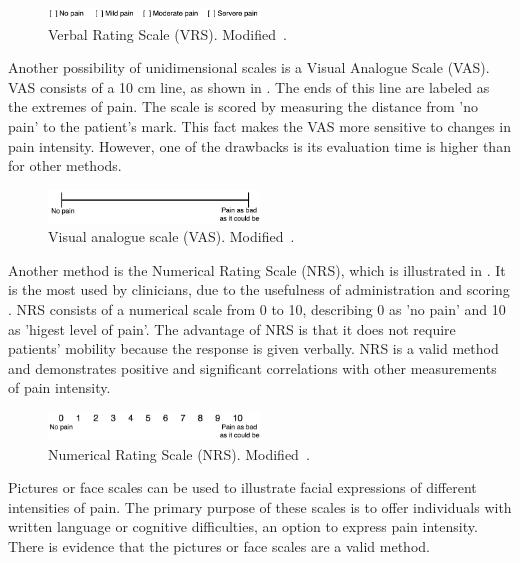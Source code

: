 \begin{figure}[H]
	\includegraphics[width=0.5\textwidth]{figures/VRS.png} 
	\caption{Verbal Rating Scale (VRS). Modified~\cite{Jensen2001}.}
	\label{fig:VRS}  
\end{figure}   

Another possibility of unidimensional scales is a Visual Analogue Scale (VAS). VAS consists of a 10 cm line, as shown in . The ends of this line are labeled as the extremes of pain. The scale is scored by measuring the distance from 'no pain' to the patient's mark. This fact makes the VAS more sensitive to changes in pain intensity. However, one of the drawbacks is its evaluation time is higher than for other methods.~\cite{Jensen2001} 

\begin{figure}[H]
	\includegraphics[width=0.5\textwidth]{figures/VAS.png} 
	\caption{Visual analogue scale (VAS). Modified~\cite{Jensen2001}.}
	\label{fig:VAS}  
\end{figure}   

Another method is the Numerical Rating Scale (NRS), which is illustrated in . It is the most used by clinicians, due to the usefulness of administration and scoring \cite{Fillingim2016}. NRS consists of a numerical scale from 0 to 10, describing 0 as 'no pain' and  10 as 'higest level of pain'. The advantage of NRS is that it does not require patients' mobility because the response is given verbally. NRS is a valid method and demonstrates positive and significant correlations with other measurements of pain intensity. \cite{Jensen2001} 

\begin{figure}[H]
	\includegraphics[width=0.5\textwidth]{figures/NRS.png} 
	\caption{Numerical Rating Scale (NRS). Modified~\cite{Jensen2001}.}
	\label{fig:NRS}  
\end{figure}   

Pictures or face scales can be used to illustrate facial expressions of different intensities of pain. The primary purpose of these scales is to offer individuals with written language or cognitive difficulties, an option to express pain intensity. There is evidence that the pictures or face scales are a valid method. \cite{Jensen2001} 


